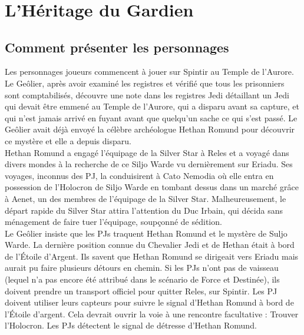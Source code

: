 \documentclass[twoside]{article}
\begin{document}
\title{\vspace{-0.5cm}{\Huge  Chroniques du gardien} \vspace{-1cm}}

\date{}
\maketitle


\section{L'Héritage du Gardien}
\subsection{Comment présenter les personnages}

Les personnages joueurs commencent à jouer sur Spintir au Temple de l'Aurore.  Le Geôlier, après avoir examiné les registres et vérifié que tous les prisonniers sont comptabilisés, découvre une note dans les registres Jedi détaillant un Jedi qui devait être emmené au Temple de l'Aurore, qui a disparu avant sa capture, et qui n'est jamais arrivé en fuyant avant que quelqu'un sache ce qui s'est passé. Le Geôlier avait déjà envoyé la célèbre archéologue Hethan Romund pour découvrir ce mystère et elle a depuis disparu.\\

Hethan Romund a engagé l'équipage de la Silver Star à Reles et a voyagé dans divers mondes à la recherche de ce Siljo Warde vu dernièrement sur Eriadu.  Ses voyages, inconnus des PJ, la conduisirent à Cato Nemodia où elle entra en possession de l'Holocron de Siljo Warde en tombant dessus dans un marché grâce à Aenet, un des membres de l'équipage de la Silver Star.  Malheureusement, le départ rapide du Silver Star attira l'attention du Duc Irbain, qui décida sans ménagement de faire tuer l'équipage, soupçonné de sédition.\\

Le Geôlier insiste que les PJs traquent Hethan Romund et le mystère de Suljo Warde. La dernière position connue du Chevalier Jedi et de Hethan était à bord de l'Étoile d'Argent.  Ils savent que Hethan Romund se dirigeait vers Eriadu mais aurait pu faire plusieurs détours en chemin. Si les PJs n'ont pas de vaisseau (lequel n'a pas encore été attribué dans le scénario de Force et Destinée), ils doivent prendre un transport officiel pour quitter Reles, sur Spintir. Les PJ doivent utiliser leurs capteurs pour suivre le signal d'Hethan Romund à bord de l'Étoile d'argent.  Cela devrait ouvrir la voie à une rencontre facultative : Trouver l'Holocron. Les PJs détectent le signal de détresse d'Hethan Romund.\\
\end{document}
